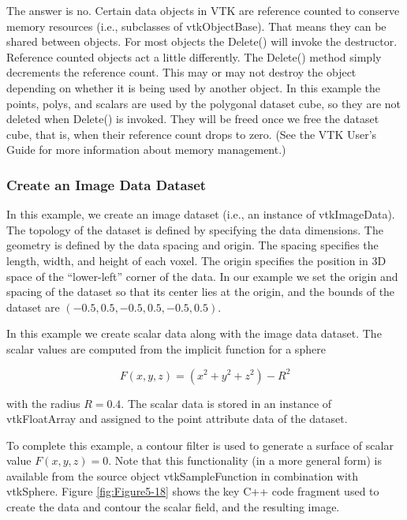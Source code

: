 The answer is no. Certain data objects in VTK are reference counted to conserve memory resources (i.e., subclasses of vtkObjectBase). That means they can be shared between objects. For most objects the Delete() will invoke the destructor. Reference counted objects act a little differently. The Delete() method simply decrements the reference count. This may or may not destroy the object depending on whether it is being used by another object. In this example the points, polys, and scalars are used by the polygonal dataset cube, so they are not deleted when Delete() is invoked. They will be freed once we free the dataset cube, that is, when their reference count drops to zero. (See the VTK User's Guide for more information about memory management.)

\subsubsection{Create an Image Data Dataset}

In this example, we create an image dataset (i.e., an instance of vtkImageData). The topology of the dataset is defined by specifying the data dimensions. The geometry is defined by the data spacing and origin. The spacing specifies the length, width, and height of each voxel. The origin specifies the position in 3D space of the ``lower-left'' corner of the data. In our example we set the origin and spacing of the dataset so that its center lies at the origin, and the bounds of the dataset are $(-0.5,0.5, -0.5,0.5, -0.5,0.5)$.

In this example we create scalar data along with the image data dataset. The scalar values are computed from the implicit function for a sphere

\begin{equation}\label{eq:5.2}
F(x,y,z) = (x^2 + y^2 + z^2)-R^2\end{equation}

with the radius $R = 0.4$. The scalar data is stored in an instance of vtkFloatArray and assigned to the point attribute data of the dataset.

To complete this example, a contour filter is used to generate a surface of scalar value $F(x, y, z) = 0$. Note that this functionality (in a more general form) is available from the source object vtkSampleFunction in combination with vtkSphere. Figure \ref{fig:Figure5-18} shows the key C++ code fragment used to create the data and contour the scalar field, and the resulting image.

